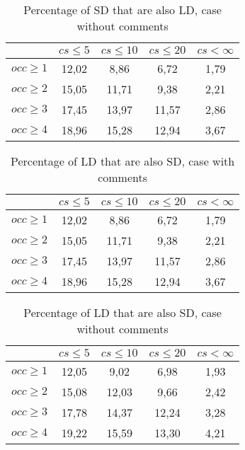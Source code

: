 \documentclass[a4paper,twoside]{article}
\begin{document}
\begin{table}[!h]
\renewcommand{\arraystretch}{1}
\caption{Percentage of SD that are also LD, case without comments}
\label{tab:percSD:nocomm}
\centering

\begin{tabular}{|c|c|c|c|c|}
\hline
	      &	$cs\leq 5$	&	$cs\leq 10$	&	$cs\leq 20$	&	$cs< \infty$	\\
\hline
$occ\geq 1$	&	12,02	&	8,86	&	6,72	&	1,79	\\
$occ\geq 2$	&	15,05	&	11,71	&	9,38	&	2,21	\\
$occ\geq 3$	&	17,45	&	13,97	&	11,57	&	2,86	\\
$occ\geq 4$	&	18,96	&	15,28	&	12,94	&	3,67	\\
\hline
\end{tabular}
\end{table}

\begin{table}[!h]
\renewcommand{\arraystretch}{1}
\caption{Percentage of LD that are also SD, case with comments}
\label{tab:percLD:comm}
\centering

\begin{tabular}{|c|c|c|c|c|}
\hline
	      &	$cs\leq 5$	&	$cs\leq 10$	&	$cs\leq 20$	&	$cs< \infty$	\\
\hline
$occ\geq 1$	&	12,02	&	8,86	&	6,72	&	1,79	\\
$occ\geq 2$	&	15,05	&	11,71	&	9,38	&	2,21	\\
$occ\geq 3$	&	17,45	&	13,97	&	11,57	&	2,86	\\
$occ\geq 4$	&	18,96	&	15,28	&	12,94	&	3,67	\\
\hline
\end{tabular}
\end{table}

\begin{table}[!h]
\renewcommand{\arraystretch}{1}
\caption{Percentage of LD that are also SD, case without comments}
\label{tab:percLD:nocomm}
\centering
\begin{tabular}{|c|c|c|c|c|}
\hline
	      &	$cs\leq 5$	&	$cs\leq 10$	&	$cs\leq 20$	&	$cs< \infty$	\\
\hline
$occ\geq 1$	&	12,05	&	9,02	&	6,98	&	1,93	\\
$occ\geq 2$	&	15,08	&	12,03	&	9,66	&	2,42	\\
$occ\geq 3$	&	17,78	&	14,37	&	12,24	&	3,28	\\
$occ\geq 4$	&	19,22	&	15,59	&	13,30	&	4,21	\\
\hline
\end{tabular}
\end{table}
\end{document}
